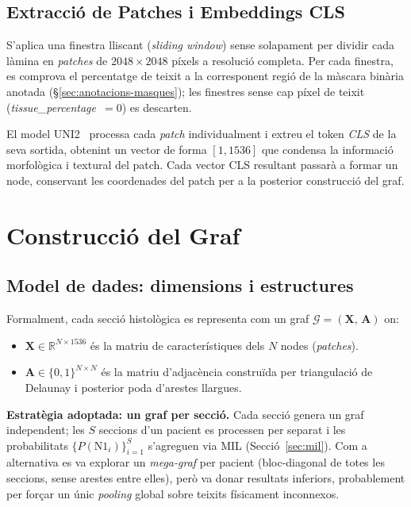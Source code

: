 \documentclass[10pt,a4paper,twocolumn,twoside]{article}
\begin{document}
\subsection{Extracció de Patches i Embeddings CLS}

S'aplica una finestra lliscant (\textit{sliding window}) sense solapament per dividir cada làmina en
\textit{patches} de $2048 \times 2048$ píxels a resolució completa. Per cada finestra, es comprova el
percentatge de teixit a la corresponent regió de la màscara binària anotada
(\S\ref{sec:anotacions-masques}); les finestres sense cap píxel de teixit (\textit{tissue\_percentage}~$= 0$)
es descarten.

El model UNI2~\cite{chen2024uni2} processa cada \textit{patch} individualment i extreu el token
\textit{CLS} de la seva sortida, obtenint un vector de forma $[1, 1536]$ que condensa la
informació morfològica i textural del patch. Cada vector CLS resultant passarà a formar un node,
conservant les coordenades del patch per a la posterior construcció del graf.

\section{Construcció del Graf}

\subsection{Model de dades: dimensions i estructures}
\label{sec:model-dades}

Formalment, cada secció histològica es representa com un graf
$\mathcal{G} = (\mathbf{X},\,\mathbf{A})$ on:
\begin{itemize}
  \item $\mathbf{X} \in \mathbb{R}^{N \times 1536}$ és la matriu de característiques dels $N$ nodes
        (\textit{patches}).
  \item $\mathbf{A} \in \{0,1\}^{N \times N}$ és la matriu d'adjacència construïda per triangulació
        de Delaunay i posterior poda d'arestes llargues.
\end{itemize}

\textbf{Estratègia adoptada: un graf per secció.} Cada secció genera un graf independent;
les $S$ seccions d'un pacient es processen per separat i les probabilitats
$\{P(\text{N1}_i)\}_{i=1}^{S}$ s'agreguen via MIL (Secció~\ref{sec:mil}).
Com a alternativa es va explorar un \textit{mega-graf} per pacient (bloc-diagonal de totes les seccions,
sense arestes entre elles), però va donar resultats inferiors,
probablement per forçar un únic \textit{pooling} global sobre teixits físicament inconnexos.
\end{document}
